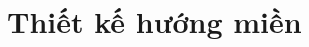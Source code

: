 \documentclass{report} %
\begin{document}
% 
% 
% 
% 

\chapter{Thiết kế hướng miền}


\end{document}
